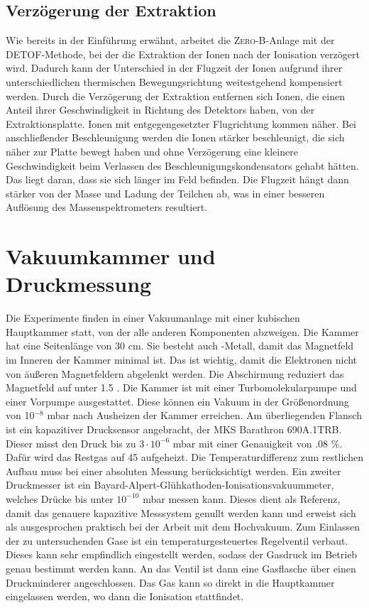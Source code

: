 \subsection{Verzögerung der Extraktion}
Wie bereits in der Einführung erwähnt, arbeitet die \textsc{Zero-B}-Anlage mit der \textsc{DETOF}-Methode, bei der die Extraktion der Ionen nach der Ionisation verzögert wird. Dadurch kann der Unterschied in der Flugzeit der Ionen aufgrund ihrer unterschiedlichen thermischen Bewegungsrichtung weitestgehend kompensiert werden. Durch die Verzögerung der Extraktion entfernen sich Ionen, die einen Anteil ihrer Geschwindigkeit in Richtung des Detektors haben, von der Extraktionsplatte. Ionen mit entgegengesetzter Flugrichtung kommen näher. Bei anschließender Beschleunigung werden die Ionen stärker beschleunigt, die sich näher zur Platte bewegt haben und ohne Verzögerung eine kleinere Geschwindigkeit beim Verlassen des Beschleunigungskondensators gehabt hätten. Das liegt daran, dass sie sich länger im Feld befinden. Die Flugzeit hängt dann stärker von der Masse und Ladung der Teilchen ab, was in einer besseren Auflösung des Massenspektrometers resultiert.

\section{Vakuumkammer und Druckmessung}
Die Experimente finden in einer Vakuumanlage mit einer kubischen Hauptkammer statt, von der alle anderen Komponenten abzweigen. Die Kammer hat eine Seitenlänge von 30 cm. Sie besteht auch \textmu{}-Metall, damit das Magnetfeld im Inneren der Kammer minimal ist. Das ist wichtig, damit die Elektronen nicht von äußeren Magnetfeldern abgelenkt werden. Die Abschirmung reduziert das Magnetfeld auf unter 1.5 . Die Kammer ist mit einer Turbomolekularpumpe und einer Vorpumpe ausgestattet. Diese können ein Vakuum in der Größenordnung von 10$^{-8}$ mbar nach Ausheizen der Kammer erreichen. Am überliegenden Flansch ist ein kapazitiver Drucksensor angebracht, der MKS Barathron 690A.1TRB. Dieser misst den Druck bis zu $3 \cdot 10^{-6}$ mbar mit einer Genauigkeit von .08 \%. Dafür wird das Restgas auf 45 \textcelsius{} aufgeheizt. Die Temperaturdifferenz zum restlichen Aufbau muss bei einer absoluten Messung berücksichtigt werden. Ein zweiter Druckmesser ist ein Bayard-Alpert-Glühkathoden-Ionisationsvakuummeter, welches Drücke bis unter $10^{-10}$ mbar messen kann. Dieses dient als Referenz, damit das genauere kapazitive Messsystem genullt werden kann und erweist sich als ausgesprochen praktisch bei der Arbeit mit dem Hochvakuum.
Zum Einlassen der zu untersuchenden Gase ist ein temperaturgesteuertes Regelventil verbaut. Dieses kann sehr empfindlich eingestellt werden, sodass der Gasdruck im Betrieb genau bestimmt werden kann. An das Ventil ist dann eine Gasflasche über einen Druckminderer angeschlossen. Das Gas kann so direkt in die Hauptkammer eingelassen werden, wo dann die Ionisation stattfindet.

